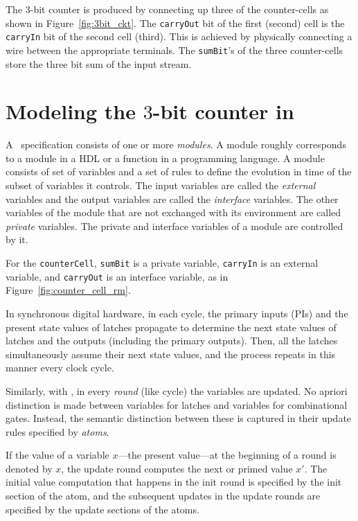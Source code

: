 The 3-bit counter is produced by connecting up three of the
counter-cells as shown in Figure~\ref{fig:3bit_ckt}. 
The {\tt carryOut} bit of the first (second) cell is the {\tt carryIn} bit of the second
cell (third). This is achieved by physically connecting a wire between the
appropriate terminals.  The {\tt sumBit}'s of the three counter-cells
store the three bit sum of the input stream. 


\section{Modeling the $3$-bit counter in \rem}
A \rem\ specification consists of one or more {\em modules}. A module
roughly corresponds to a module in a HDL or a function in a
programming language. A module consists of set of variables and a set
of rules to define the evolution in time of the subset of variables it
controls. The input variables are called the {\em external} variables and
the output variables are called the {\em interface} variables.
The other variables of the module that are not exchanged with
its environment are called {\em private} variables. The private and
interface variables of a module are controlled by it. 

For the {\tt counterCell}, {\tt sumBit} is a private variable, {\tt carryIn} is an
external variable, and {\tt carryOut} is an interface variable, as in Figure~\ref{fig:counter_cell_rm}. 

In synchronous digital hardware, in each cycle, the primary inputs
(PIs) and the present state values of latches propagate to determine
the next state values of latches and the outputs (including the
primary outputs). Then, all the latches simultaneously assume their
next state values, and the process repeats in this manner every clock cycle. 

Similarly, with \rem, in every {\em round} (like cycle) the variables
are updated. No apriori distinction is made between variables for
latches and variables for combinational gates. Instead, the semantic
distinction between these is captured in their update rules specified
by {\em atoms}. 

If the value of a variable $x$---the present value---at the beginning
of a round is denoted by $x$, the update round computes the next or
primed value $x'$. The initial value computation that happens in the
init round is specified by the init section of the atom, and the
subsequent updates in the update rounds are specified by the update
sections of the atoms.

